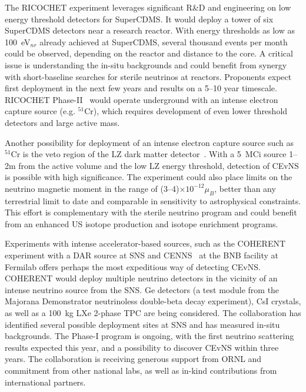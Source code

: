 The RICOCHET experiment leverages significant R\&D and engineering on
low energy threshold detectors for SuperCDMS. It would deploy a tower
of six SuperCDMS detectors near a research reactor. With energy
thresholds as low as 100~eV$_{nr}$ already achieved at SuperCDMS,
several thousand events per month could be observed, depending on the
reactor and distance to the core. A critical issue is understanding
the in-situ backgrounds and could benefit from synergy with
short-baseline searches for sterile neutrinos at reactors.  Proponents
expect first deployment in the next few years and results on a 5--10
year timescale.  RICOCHET Phase-II~\cite{Formaggio:2011jt} would
operate underground with an intense electron capture source
(e.g. $^{51}$Cr), which requires development of even lower threshold
detectors and large active mass.

Another possibility for deployment of an intense electron capture
source such as $^{51}$Cr is the veto region of the LZ dark matter
detector~\cite{Coloma:2014hka}. With a 5~MCi source 1--2m from the
active volume and the low LZ energy threshold, detection
of CEvNS is possible with high significance. The experiment could
also place limits on the neutrino magnetic moment in the range
of (3--4)$\times10^{-12}\mu_B$, better than any terrestrial limit to
date and comparable in sensitivity to astrophysical constraints. This
effort is complementary with the sterile neutrino program and
could benefit from an enhanced US isotope production and
isotope enrichment programs.


Experiments with intense accelerator-based sources, such as the
COHERENT~\cite{Akimov:2013yow} experiment with a DAR source at SNS and
CENNS~\cite{Brice:2013fwa} at the BNB facility at Fermilab offers
perhaps the most expeditious way of detecting CEvNS. COHERENT
would deploy multiple neutrino detectors in the vicinity of an intense
neutrino source from the SNS. Ge detectors (a test module from
the {\sc Majorana Demonstrator\/} neutrinoless double-beta decay
experiment), CsI crystals, as well as a 100~kg LXe 2-phase TPC are
being considered. The collaboration has identified several possible
deployment sites at SNS and has measured in-situ backgrounds.  The
Phase-I program is  ongoing, with the first neutrino scattering
results expected this year, and a possibility to discover CEvNS
within three years. The collaboration is receiving generous support
from ORNL and commitment from other national labs, as well as in-kind
contributions from international partners. 


